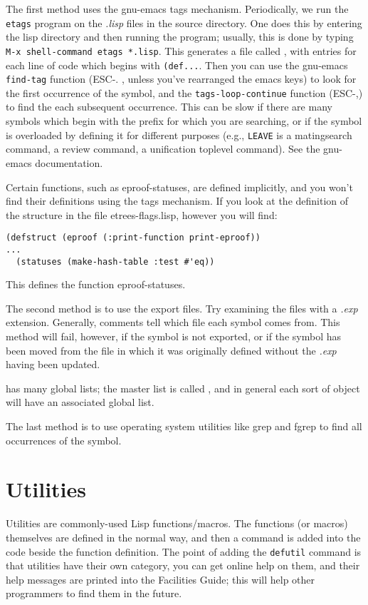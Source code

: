 The first method uses the gnu-emacs tags mechanism. Periodically, we run the 
{\tt etags} program on the
{\it .lisp} files in the source directory. One does this by entering the \TPS
lisp directory and then running the  program; usually, 
this is done by typing {\tt M-x shell-command etags *.lisp}.  
This generates a file called
{\it {}}, with entries for each line of code which begins with
{\tt (def...}. Then you can use the gnu-emacs {\tt find-tag} function (ESC-. , 
unless you've rearranged the emacs keys) to look
for the first occurrence of the symbol, and the {\tt tags-loop-continue} function
(ESC-,) to find the each subsequent occurrence.  
This can be slow if there are many symbols which begin with the
prefix for which you are searching, or if the symbol is overloaded by 
defining it for different purposes (e.g., {\tt LEAVE} is a
matingsearch command, a review command, a unification toplevel command).  
See the gnu-emacs documentation.

Certain functions, such as eproof-statuses, are defined implicitly,
and you won't find their definitions using the tags mechanism. If you
look at the definition of the structure  in the file
etrees-flags.lisp, however you will find:
\begin{verbatim}
(defstruct (eproof (:print-function print-eproof))
...
  (statuses (make-hash-table :test #'eq))
\end{verbatim}
This defines the function eproof-statuses.

The second method is to use the \TPS export files. Try
examining the files with a {\it .exp} extension.  Generally, comments 
tell which file each symbol comes from.  This method will fail,
however, if the symbol is not exported, or if the symbol has been
moved from the file in which it was originally defined without the
{\it .exp} having been updated.

\TPS has many global lists; the master list is called 
, and in general each sort of \TPS object 
will have an associated global list. 

The last method is to use operating system utilities like grep and
fgrep to find all occurrences of the symbol.


\section{Utilities}
Utilities are commonly-used Lisp functions/macros. The functions (or macros) themselves 
are defined in the normal way, and then a  command is added into 
the code beside the function definition. The point of adding the {\tt defutil} command is
that utilities have their own \TPS category, you can get online help on them, and their 
help messages are printed into the Facilities Guide; this will help other \TPS 
programmers to find them in the future.
 
